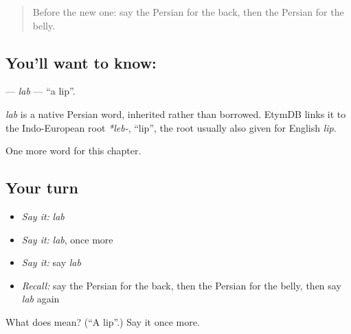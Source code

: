 \label{lesson:FA-C29-lab}



\begin{quote}
Before the new one: say the Persian for the back, then the Persian for the belly.
\end{quote}

\subsection*{You'll want to know: }
\textbf{} — \emph{lab} — \textquotedblleft{}a lip\textquotedblright{}.

\begin{cousinweb}
\emph{lab} is a native Persian word, inherited rather than borrowed. EtymDB links it to the Indo-European root \emph{*leb-}, \textquotedblleft{}lip\textquotedblright{}, the root usually also given for English \emph{lip}.
\end{cousinweb}

\begin{grammarlens}[title={What you've built}]
One more word for this chapter.
\end{grammarlens}

\subsection*{Your turn}
\begin{itemize}
\raggedright
  \item \emph{Say it:} \emph{lab}
  \item \emph{Say it:} \emph{lab}, once more
  \item \emph{Say it:} say \emph{lab}
  \item \emph{Recall:} say the Persian for the back, then the Persian for the belly, then say \emph{lab} again
\end{itemize}

\begin{tcolorbox}[breakable,colback=teal!4,colframe=teal!35!black,title={Before you move on}]
What does  mean? (\textquotedblleft{}A lip\textquotedblright{}.) Say it once more.
\end{tcolorbox}
